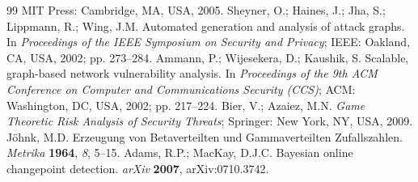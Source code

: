 \documentclass[conference]{IEEEtran}
\begin{document}
\begin{thebibliography}{99}
    MIT Press: Cambridge, MA, USA, 2005.
    Sheyner, O.; Haines, J.; Jha, S.; Lippmann, R.; Wing, J.M.
    Automated generation and analysis of attack graphs.
    In \textit{Proceedings of the IEEE Symposium on Security and Privacy};
    IEEE: Oakland, CA, USA, 2002; pp. 273--284.
    Ammann, P.; Wijesekera, D.; Kaushik, S.
    Scalable, graph-based network vulnerability analysis.
    In \textit{Proceedings of the 9th ACM Conference on Computer and Communications Security (CCS)};
    ACM: Washington, DC, USA, 2002; pp. 217--224.
    Bier, V.; Azaiez, M.N.
    \textit{Game Theoretic Risk Analysis of Security Threats};
    Springer: New York, NY, USA, 2009.
    Jöhnk, M.D.
    Erzeugung von Betaverteilten und Gammaverteilten Zufallszahlen.
    \textit{Metrika} \textbf{1964}, \textit{8}, 5--15.
    Adams, R.P.; MacKay, D.J.C.
    Bayesian online changepoint detection.
    \textit{arXiv} \textbf{2007}, arXiv:0710.3742.
  \end{thebibliography}
  
\end{document}
